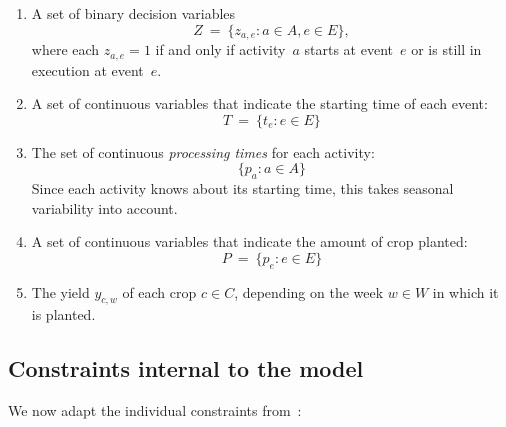 \documentclass[11pt,reqno]{amsart}
\numberwithin{equation}{section}
\begin{document}
\begin{enumerate}
\item A set of binary decision variables 
  \[
     Z
     \ = \
     \big\{z_{a,e}: a\in A, e\in E\big\},
  \]
  where each $z_{a,e}=1$ if and only if activity~$a$ starts at
  event~$e$ or is still in execution at event~$e$.

\smallskip
\item A set of continuous variables that indicate the starting time of each event:
  \[
     T
     \ = \
     \big\{t_e : e\in E\big\}
  \]

\smallskip
\item The set of continuous \emph{processing times} for each activity:
  \[
      \{p_a:a\in A\}
  \]  
  Since each activity knows about its starting time, this takes seasonal variability into
  account.

\smallskip
\item A set of continuous variables that indicate the amount of crop planted:
  \[
     P
     \ = \
     \big\{p_e : e\in E\big\}
  \]
  \smallskip

\item The yield $y_{c,w}$ of each crop $c\in C$, depending on the week $w\in W$ in which
  it is planted.

\end{enumerate}

\subsection{Constraints internal to the model}

We now adapt the individual constraints from~\cite{artigues-etal11}:
\end{document}
